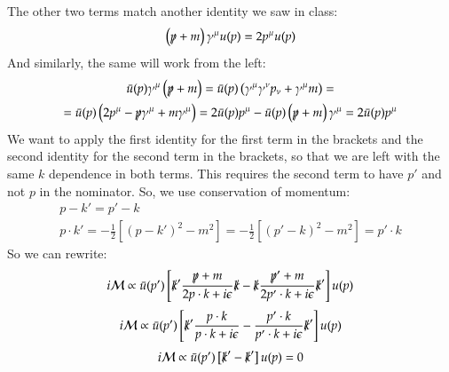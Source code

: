 \documentclass{article}
\begin{document}
The other two terms match another identity we saw in class:
\begin{equation}
    \left(\slashed{p} + m\right)\gamma^\mu u(p) = 2p^\mu u(p)
\end{equation}
And similarly, the same will work from the left:
\begin{equation}
\begin{gathered}
    \bar{u}(p) \gamma^\mu \left(\slashed{p} + m\right) =
    \bar{u}(p) \left(\gamma^\mu \gamma^\nu p_\nu + \gamma^\mu m\right) = \\ =
    \bar{u}(p) \left(2 p^\mu - \slashed{p}\gamma^\mu + m \gamma^\mu\right) =
    2 \bar{u}(p) p^\mu - \bar{u}(p) \left(\slashed{p} + m \right)\gamma^\mu =
    2 \bar{u}(p) p^\mu
\end{gathered}
\end{equation}
We want to apply the first identity for the first term in the brackets and the second identity for the second term in the brackets, so that we are left with the same $k$ dependence in both terms. This requires the second term to have $p'$ and not $p$ in the nominator. So, we use conservation of momentum:
\begin{equation}
\begin{gathered}
    p - k' = p' - k
    \\
    p\cdot k' = -\frac{1}{2}\left[(p - k')^2 - m^2\right] = -\frac{1}{2}\left[(p' - k)^2 - m^2\right] = p' \cdot k
\end{gathered}
\end{equation}
So we can rewrite:
\begin{equation}
    i\mathcal{M} \propto
    \bar{u}(p') \left[
        \slashed{k}' \frac{\slashed{p} + m}{2p\cdot k + i\epsilon}\slashed{k} -
        \slashed{k} \frac{\slashed{p}' + m}{2p'\cdot k + i\epsilon}\slashed{k}'
    \right] u(p)
\end{equation}
\begin{equation}
    i\mathcal{M} \propto
    \bar{u}(p') \left[
        \slashed{k}' \frac{p\cdot k}{p\cdot k + i\epsilon} -
        \frac{p' \cdot k}{p'\cdot k + i\epsilon}\slashed{k}'
    \right] u(p)
\end{equation}
\begin{equation}
    i\mathcal{M} \propto
    \bar{u}(p') \left[
        \slashed{k}' -
        \slashed{k}'
    \right] u(p) = 0
\end{equation}
\end{document}
